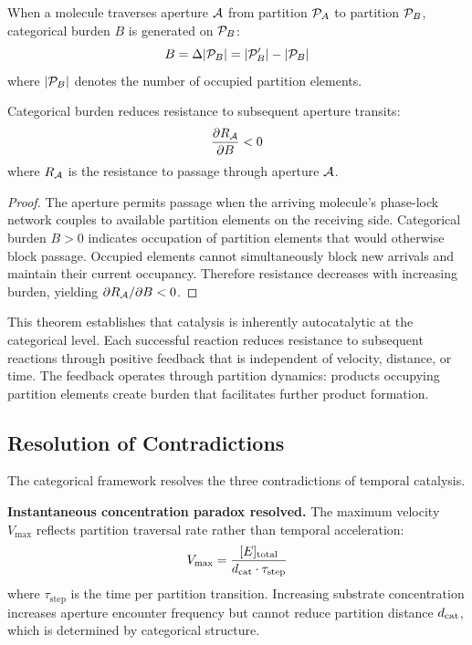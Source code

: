 \begin{definition}
\label{def:burden}
When a molecule traverses aperture $\mathcal{A}$ from partition $\mathcal{P}_A$ to partition $\mathcal{P}_B$, categorical burden $B$ is generated on $\mathcal{P}_B$:
\begin{equation}
B = \Delta|\mathcal{P}_B| = |\mathcal{P}_B'| - |\mathcal{P}_B|
\end{equation}
where $|\mathcal{P}_B|$ denotes the number of occupied partition elements.
\end{definition}

\begin{theorem}
\label{thm:autocatalysis}
Categorical burden reduces resistance to subsequent aperture transits:
\begin{equation}
\frac{\partial R_{\mathcal{A}}}{\partial B} < 0
\end{equation}
where $R_{\mathcal{A}}$ is the resistance to passage through aperture $\mathcal{A}$.
\end{theorem}

\begin{proof}
The aperture permits passage when the arriving molecule's phase-lock network couples to available partition elements on the receiving side. Categorical burden $B > 0$ indicates occupation of partition elements that would otherwise block passage. Occupied elements cannot simultaneously block new arrivals and maintain their current occupancy. Therefore resistance decreases with increasing burden, yielding $\partial R_{\mathcal{A}}/\partial B < 0$.
\end{proof}

This theorem establishes that catalysis is inherently autocatalytic at the categorical level. Each successful reaction reduces resistance to subsequent reactions through positive feedback that is independent of velocity, distance, or time. The feedback operates through partition dynamics: products occupying partition elements create burden that facilitates further product formation.

\subsection{Resolution of Contradictions}

The categorical framework resolves the three contradictions of temporal catalysis.

\textbf{Instantaneous concentration paradox resolved.} The maximum velocity $V_{\max}$ reflects partition traversal rate rather than temporal acceleration:
\begin{equation}
V_{\max} = \frac{[E]_{\mathrm{total}}}{d_{\mathrm{cat}} \cdot \tau_{\mathrm{step}}}
\end{equation}
where $\tau_{\mathrm{step}}$ is the time per partition transition. Increasing substrate concentration increases aperture encounter frequency but cannot reduce partition distance $d_{\mathrm{cat}}$, which is determined by categorical structure.

